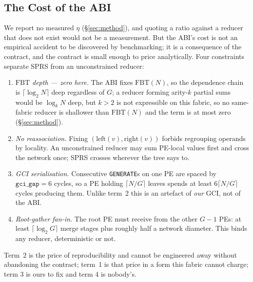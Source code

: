 \documentclass[journal,10pt]{IEEEtran}
\theoremstyle{plain}
\theoremstyle{definition}
\theoremstyle{remark}
\newcommand{\FBT}{\ensuremath{\mathrm{FBT}}}
\newcommand{\sprs}{\textsc{SPRS}}
\newcommand{\sv}[1]{\texttt{#1}}
\begin{document}
\subsection{The Cost of the ABI}\label{sec:results-overhead}

We report no measured $\eta$ (\S\ref{sec:method}), and quoting a ratio against
a reducer that does not exist would not be a measurement. But the ABI's cost
is not an empirical accident to be discovered by benchmarking; it is a
consequence of the contract, and the contract is small enough to price
analytically. Four constraints separate \sprs{} from an unconstrained reducer:

\begin{enumerate}[leftmargin=1.4em]
\item \emph{\FBT{} depth --- zero here.} The ABI fixes $\FBT(N)$, so the
  dependence chain is $\lceil\log_2 N\rceil$ deep regardless of $G$; a
  reducer forming arity-$k$ partial sums would be $\log_k N$ deep, but $k > 2$
  is not expressible on this fabric, so no same-fabric reducer is shallower
  than $\FBT(N)$ and the term is at most zero (\S\ref{sec:method}).
\item \emph{No reassociation.} Fixing $(\mathrm{left}(v),\mathrm{right}(v))$
  forbids regrouping operands by locality. An unconstrained reducer may sum
  PE-local values first and cross the network once; \sprs{} crosses wherever
  the tree says to.
\item \emph{GCI serialisation.} Consecutive \texttt{GENERATE}s on one PE are
  spaced by $\sv{gci\_gap} = 6$ cycles, so a PE holding $\lceil N/G\rceil$
  leaves spends at least $6\lceil N/G\rceil$ cycles producing them. Unlike
  term~2 this is an artefact of \emph{our} GCI, not of the ABI.
\item \emph{Root-gather fan-in.} The root PE must receive from the other $G-1$
  PEs: at least $\lceil\log_2 G\rceil$ merge stages plus roughly half a
  network diameter. This binds any reducer, deterministic or not.
\end{enumerate}

Term~2 is the price of reproducibility and cannot be engineered away without
abandoning the contract; term~1 is that price in a form this fabric cannot
charge; term 3 is ours to fix and term 4 is nobody's.
\end{document}
